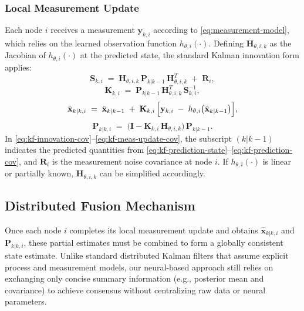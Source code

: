 \documentclass[letterpaper, 10 pt, conference]{ieeeconf}
\begin{document}
\subsubsection{Local Measurement Update}
Each node $i$ receives a measurement $\mathbf{y}_{k,i}$ according to \eqref{eq:measurement-model}, which relies on the learned observation function $h_{\theta,i}(\cdot)$. Defining $\mathbf{H}_{\theta,i,k}$ as the Jacobian of $h_{\theta,i}(\cdot)$ at the predicted state, the standard Kalman innovation form applies:
\begin{equation}
    \mathbf{S}_{k,i} \;=\; \mathbf{H}_{\theta,i,k}\,\mathbf{P}_{k|k-1}\,\mathbf{H}_{\theta,i,k}^{T} \;+\; \mathbf{R}_i,
    \label{eq:kf-innovation-cov}
\end{equation}
\begin{equation}
    \mathbf{K}_{k,i} \;=\; \mathbf{P}_{k|k-1}\,\mathbf{H}_{\theta,i,k}^{T}\,\mathbf{S}_{k,i}^{-1},
    \label{eq:kf-kalman-gain}
\end{equation}
\begin{equation}
    \hat{\mathbf{x}}_{k|k,i} \;=\; \hat{\mathbf{x}}_{k|k-1} \;+\; \mathbf{K}_{k,i}\,\Bigl[\mathbf{y}_{k,i} \;-\; h_{\theta,i}\bigl(\hat{\mathbf{x}}_{k|k-1}\bigr)\Bigr],
    \label{eq:kf-meas-update-state}
\end{equation}
\begin{equation}
    \mathbf{P}_{k|k,i} \;=\; \bigl(\mathbf{I} - \mathbf{K}_{k,i}\,\mathbf{H}_{\theta,i,k}\bigr)\,\mathbf{P}_{k|k-1}.
    \label{eq:kf-meas-update-cov}
\end{equation}
In \eqref{eq:kf-innovation-cov}--\eqref{eq:kf-meas-update-cov}, the subscript $(k|k-1)$ indicates the predicted quantities from \eqref{eq:kf-prediction-state}--\eqref{eq:kf-prediction-cov}, and $\mathbf{R}_i$ is the measurement noise covariance at node $i$. If $h_{\theta,i}(\cdot)$ is linear or partially known, $\mathbf{H}_{\theta,i,k}$ can be simplified accordingly.

\subsection{Distributed Fusion Mechanism}
\label{sec:distributed-fusion}

Once each node $i$ completes its local measurement update and obtains $\hat{\mathbf{x}}_{k|k,i}$ and $\mathbf{P}_{k|k,i}$, these partial estimates must be combined to form a globally consistent state estimate. Unlike standard distributed Kalman filters that assume explicit process and measurement models, our neural-based approach still relies on exchanging only concise summary information (e.g., posterior mean and covariance) to achieve consensus without centralizing raw data or neural parameters.
\end{document}
